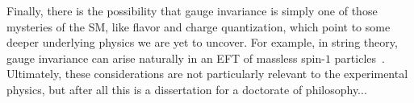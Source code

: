 Finally, there is the possibility that gauge invariance is simply one of those mysteries of the SM, like flavor and charge quantization, which point to some deeper underlying physics we are yet to uncover.
For example, in string theory, gauge invariance can arise naturally in an EFT of massless spin-$1$ particles~\cite{Green:1987sp}.
Ultimately, these considerations are not particularly relevant to the experimental physics, but after all this is a dissertation for a doctorate of philosophy...
